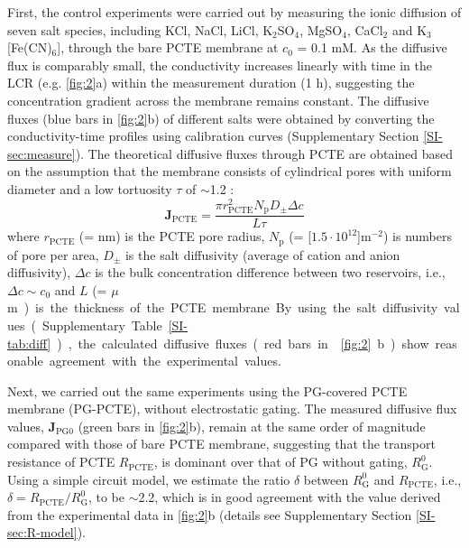 First, the control experiments were carried out by measuring the ionic
diffusion of seven salt species, including KCl, NaCl, LiCl,
K$_{2}$SO$_{4}$, MgSO$_{4}$, CaCl$_{2}$ and K$_{3}$[Fe(CN)$_{6}$],
through the bare PCTE membrane at $c_{0}$ = 0.1 mM. As the diffusive
flux is comparably small, the conductivity increases linearly with
time in the LCR (e.g. \Fig{} \ref{fig:2}a) within the measurement
duration (1 h), suggesting the concentration gradient across the
membrane remains constant. The diffusive fluxes (blue bars in \Fig{}
\ref{fig:2}b) of different salts were obtained by converting the
conductivity-time profiles using calibration curves (Supplementary
Section \ref{SI-sec:measure}). The theoretical diffusive fluxes
through PCTE are obtained based on the assumption that the membrane
consists of cylindrical pores with uniform diameter and a low
tortuosity $\tau$ of $\sim{}$1.2 \cite{O_Hern_2012}:
\begin{equation}
  \label{eq:j-pcte}
  \boldsymbol{J}_{\mathrm{PCTE}} = \frac{\pi r_{\mathrm{PCTE}}^{2} N_{\mathrm{p}} D_{\mathrm{\pm}} \Delta c}{L \tau}
\end{equation}
{where $r_{\mathrm{PCTE}}$ (= \unit[200]{nm}) is the PCTE pore radius, $N_{\mathrm{p}}$  (= \unit[$1.5\cdot10^{12}$]{m$^{-2}$}) is
numbers of pore per area, $D_{\mathrm{\pm}}$ is the salt diffusivity
(average of cation and anion diffusivity), $\Delta c$ is the bulk
concentration difference between two reservoirs, i.e.,
$\Delta c \sim c_{0}$ and $L$ (= \unit[24]{$\mu$m}) is the thickness of the PCTE membrane.
By using the salt diffusivity values (Supplementary Table
\ref{SI-tab:diff}), the calculated diffusive fluxes (red bars in
\Fig{} \ref{fig:2}b) show reasonable agreement with the experimental
values.}

Next, we carried out the same experiments using the PG-covered PCTE
membrane (PG-PCTE), without electrostatic gating. The measured
diffusive flux values, $\boldsymbol{J}_{\mathrm{PG0}}$ (green bars in
\Fig{} \ref{fig:2}b), remain at the same order of magnitude compared
with those of bare PCTE membrane, suggesting that the transport
resistance of PCTE $R_{\mathrm{PCTE}}$, is dominant over that of PG
without gating, $R_{\mathrm{G}}^{0}$. Using a simple circuit model, we
estimate the ratio $\delta$ between $R_{\mathrm{G}}^{0}$ and
$R_{\mathrm{PCTE}}$, i.e.,
$\delta = R_{\mathrm{PCTE}}/R_{\mathrm{G}}^{0}$, to be $\sim$2.2,
which is in good agreement with the value derived from the
experimental data in \Fig{} \ref{fig:2}b (details see Supplementary
Section \ref{SI-sec:R-model}).


